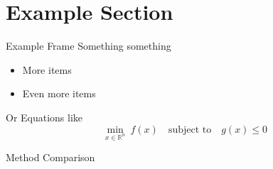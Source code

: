 \section{Example Section}
\begin{frame}{Example Frame}
    Something something
    \begin{itemize}
        \item More items
        \item Even more items
    \end{itemize}

    Or Equations like
    \begin{equation}
        \label{eq:example}
        \min_{x \in \mathbb{R}^n} \ f(x) \quad \text{subject to} \quad g(x) \leq 0
    \end{equation}
\end{frame}

\begin{frame}{Method Comparison}
    \centering
    
\end{frame}